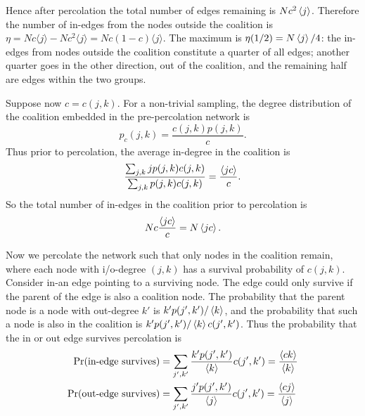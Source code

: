 \documentclass[10pt]{beamer}
\begin{document}
\begin{frame}

Hence after percolation the total number of edges remaining is $Nc^2\expval{j}$. Therefore the number of in-edges from the nodes outside the coalition is $\eta = Nc\langle j \rangle - Nc^2\langle j \rangle = Nc(1-c) \langle j \rangle$. The maximum is $\eta (1/2) = N\expval{j}/4$: the in-edges from nodes outside the coalition constitute a quarter of all edges; another quarter goes in the other direction, out of the coalition, and the remaining half are edges within the two groups.

\end{frame}

\begin{frame}

Suppose now $c = c(j,k)$. For a non-trivial sampling, the degree distribution of the coalition embedded in the pre-percolation network is
\begin{equation}
p_c(j,k) = \frac{c(j,k)p(j,k)}{c}.
\end{equation}
Thus prior to percolation, the average in-degree in the coalition is
\begin{equation}
\frac{\sum_{j,k} j p(j,k) c(j,k)}{\sum_{j,k} p(j,k) c(j,k)} = \frac{\expval{jc}}{c}.
\end{equation}
So the total number of in-edges in the coalition prior to percolation is
\begin{equation}
Nc \frac{\expval{jc}}{c} = N\expval{jc}.
\end{equation}
\end{frame}

\begin{frame}
Now we percolate the network such that only nodes in the coalition remain, where each node with i/o-degree $(j,k)$ has a survival probability of $c(j,k)$. Consider in-an edge pointing to a surviving node. The edge could only survive if the parent of the edge is also a coalition node. The probability that the parent node is a node with out-degree $k'$ is $k'p(j',k')/\expval{k}$, and the probability that such a node is also in the coalition is $k'p(j',k')/\expval{k} c(j',k')$. Thus the probability that the in or out edge survives percolation is
\begin{align}
\Pr(\text{in-edge survives}) &= \sum_{j',k'} \frac{k'p(j',k')}{\expval{k}} c(j',k') = \frac{\expval{ck}}{\expval{k}} \\
\Pr(\text{out-edge survives}) &= \sum_{j',k'} \frac{j'p(j',k')}{\expval{j}} c(j',k') = \frac{\expval{cj}}{\expval{j}}
\end{align}
\end{frame}
\end{document}
